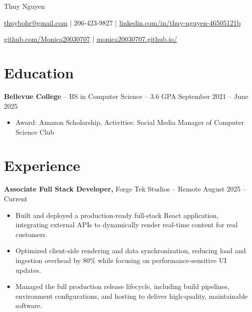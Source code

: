 \documentclass[11pt]{article}       %
\begin{document}
\centerline{\Huge Thuy Nguyen}

\vspace{5pt}

\centerline{\href{mailto:thuybohr@gmail.com}{thuybohr@gmail.com} | 206-423-9827 |
\href{https://www.linkedin.com/in/thuy-nguyen-46505121b/}{linkedin.com/in/thuy-nguyen-46505121b}}

\centerline{\href{https://github.com/Monica20030707}{github.com/Monica20030707} | 
\href{https://monica20030707.github.io/}{monica20030707.github.io/}} 

\vspace{-9pt}

\section*{Education}
\textbf{Bellevue College} -- BS in Computer Science -- 3.6 GPA \hfill September 2021 -- June 2025\\
\vspace{-9pt}
\begin{itemize}
  \item Award: Amazon Scholarship, Activities: Social Media Manager of Computer Science Club
\end{itemize}

\vspace{-18.5pt}

\section*{Experience}

\textbf{Associate Full Stack Developer,} {Forge Tek Studios} -- Remote \hfill August 2025 -- Current 
\vspace{-9pt}
\begin{itemize}
  \item Built and deployed a production-ready full-stack React application, integrating external APIs to dynamically render real-time content for real customers.
  \item Optimized client-side rendering and data synchronization, reducing load and ingestion overhead by 80\% while focusing on performance-sensitive UI updates.
  \item Managed the full production release lifecycle, including build pipelines, environment configurations, and hosting to deliver high-quality, maintainable software.
\end{itemize}
\end{document}

